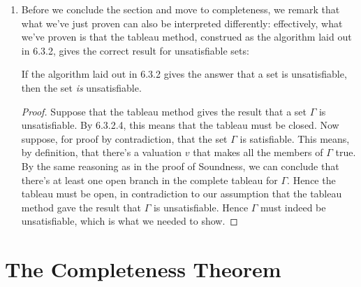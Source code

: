 \begin{enumerate}[\thesection.1]
\begin{proof}
	But if $B$ cannot be closed, then $B$ must be open. Since a tableau is open iff at least one branch in the tableau is open (6.3.2.4), we conclude that our complete tableau must be open. Hence $\Gamma\nvdash\phi$, by definition, which is what we needed to show.
	
	\end{proof}
	
  \item Before we conclude the section and move to completeness, we remark that what we've just proven can also be interpreted differently:
	effectively, what we've proven is that the tableau method,
	construed as the algorithm laid out in 6.3.2,
	gives the correct result for unsatisfiable sets:
	\begin{theorem}
	If the algorithm laid out in 6.3.2 gives the answer that a set is unsatisfiable, then the set \emph{is} unsatisfiable. 
	\end{theorem}
	\begin{proof}
	  Suppose that the tableau method gives the result that a set $\Gamma$ is unsatisfiable.
	  By 6.3.2.4, this means that the tableau must be closed.
	  Now suppose, for proof by contradiction, that the set $\Gamma$ is satisfiable.
	  This means, by definition, that there's a valuation $v$ that makes all the members of $\Gamma$ true.
	  By the same reasoning as in the proof of Soundness,
	  we can conclude that there's at least one open branch in the complete tableau for $\Gamma$.
	  Hence the tableau must be open,
	  in contradiction to our assumption that the tableau method gave the result that $\Gamma$ is unsatisfiable.
	  Hence $\Gamma$ must indeed be unsatisfiable,
	  which is what we needed to show.
	\end{proof}

\end{enumerate}

\section{The Completeness Theorem}

